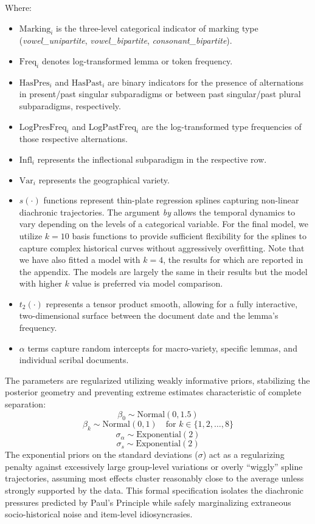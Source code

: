 Where:
\begin{itemize}
    \item \textbf{$\text{Marking}_i$} is the three-level categorical indicator of marking type (\textit{vowel\_unipartite}, \textit{vowel\_bipartite}, \textit{consonant\_bipartite}).
    \item \textbf{$\text{Freq}_i$} denotes log-transformed lemma or token frequency.
    \item \textbf{$\text{HasPres}_i$} and \textbf{$\text{HasPast}_i$} are binary indicators for the presence of alternations in present/past singular subparadigms or between past singular/past plural subparadigms, respectively.
    \item \textbf{$\text{LogPresFreq}_i$} and \textbf{$\text{LogPastFreq}_i$} are the log-transformed type frequencies of those respective alternations.
    \item \textbf{$\text{Infl}_i$} represents the inflectional subparadigm in the respective row.
    \item \textbf{$\text{Var}_i$} represents the geographical variety.
    \item \textbf{$s(\cdot)$} functions represent thin-plate regression splines capturing non-linear diachronic trajectories. The argument \textit{by} allows the temporal dynamics to vary depending on the levels of a categorical variable. For the final model, we utilize $k=10$ basis functions to provide sufficient flexibility for the splines to capture complex historical curves without aggressively overfitting. Note that we have also fitted a model with $k=4$, the results for which are reported in the appendix. The models are largely the same in their results but the model with higher $k$ value is preferred via model comparison.
    \item \textbf{$t_2(\cdot)$} represents a tensor product smooth, allowing for a fully interactive, two-dimensional surface between the document date and the lemma's frequency.
    \item \textbf{$\alpha$} terms capture random intercepts for macro-variety, specific lemmas, and individual scribal documents.
\end{itemize}

The parameters are regularized utilizing weakly informative priors, stabilizing the posterior geometry and preventing extreme estimates characteristic of complete separation:
$$\beta_0 \sim \text{Normal}(0, 1.5)$$
$$\beta_k \sim \text{Normal}(0, 1) \quad \text{for } k \in \{1, 2, \dots, 8\}$$
$$\sigma_{\alpha} \sim \text{Exponential}(2)$$
$$\sigma_{s} \sim \text{Exponential}(2)$$
The exponential priors on the standard deviations ($\sigma$) act as a regularizing penalty against excessively large group-level variations or overly ``wiggly'' spline trajectories, assuming most effects cluster reasonably close to the average unless strongly supported by the data. This formal specification isolates the diachronic pressures predicted by Paul's Principle while safely marginalizing extraneous socio-historical noise and item-level idiosyncrasies.

